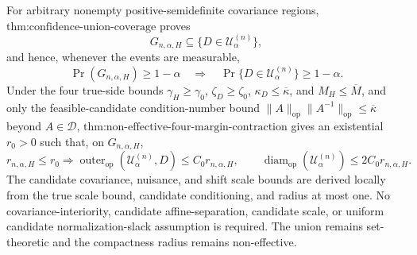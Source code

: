 For arbitrary nonempty positive-semidefinite covariance regions, \(\text{thm:confidence-union-coverage}\) proves
\[
G_{n,\alpha,H}\subseteq\{D\in\mathcal U^{(n)}_\alpha\},
\]
and hence, whenever the events are measurable,
\[
\Pr(G_{n,\alpha,H})\geq1-\alpha
\quad\Longrightarrow\quad
\Pr\{D\in\mathcal U^{(n)}_\alpha\}\geq1-\alpha.
\]
Under the four true-side bounds \(\gamma_H\geq\gamma_0\), \(\zeta_D\geq\zeta_0\), \(\kappa_D\leq\overline\kappa\), and \(M_H\leq\overline M\), and only the feasible-candidate condition-number bound \(\|A\|_{\mathrm{op}}\|A^{-1}\|_{\mathrm{op}}\leq\overline\kappa\) beyond \(A\in\mathcal D\), \(\text{thm:non-effective-four-margin-contraction}\) gives an existential \(r_0>0\) such that, on \(G_{n,\alpha,H}\),
\[
r_{n,\alpha,H}\leq r_0
\Longrightarrow
\operatorname{outer}_{\mathrm{op}}(\mathcal U^{(n)}_\alpha,D)
\leq C_0r_{n,\alpha,H},
\qquad
\operatorname{diam}_{\mathrm{op}}(\mathcal U^{(n)}_\alpha)
\leq2C_0r_{n,\alpha,H}.
\]
The candidate covariance, nuisance, and shift scale bounds are derived locally from the true scale bound, candidate conditioning, and radius at most one. No covariance-interiority, candidate affine-separation, candidate scale, or uniform candidate normalization-slack assumption is required. The union remains set-theoretic and the compactness radius remains non-effective.